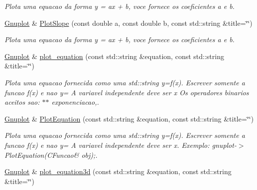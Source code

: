 \begin{DoxyCompactItemize}
\begin{DoxyCompactList}\small\item\em Plota uma equacao da forma y = ax + b, voce fornece os coeficientes a e b. \end{DoxyCompactList}\item 
\hypertarget{classGnuplot_af4c2215781aa7a32ba73caa26941407c}{\hyperlink{classGnuplot}{Gnuplot} \& \hyperlink{classGnuplot_af4c2215781aa7a32ba73caa26941407c}{Plot\-Slope} (const double a, const double b, const std\-::string \&title=\char`\"{}\char`\"{})}\label{classGnuplot_af4c2215781aa7a32ba73caa26941407c}

\begin{DoxyCompactList}\small\item\em Plota uma equacao da forma y = ax + b, voce fornece os coeficientes a e b. \end{DoxyCompactList}\item 
\hyperlink{classGnuplot}{Gnuplot} \& \hyperlink{classGnuplot_a42dfb8c9d4636745c7be277ed818e849}{plot\-\_\-equation} (const std\-::string \&equation, const std\-::string \&title=\char`\"{}\char`\"{})
\begin{DoxyCompactList}\small\item\em Plota uma equacao fornecida como uma std\-::string y=f(x). Escrever somente a funcao f(x) e nao y= A variavel independente deve ser x Os operadores binarios aceitos sao\-: $\ast$$\ast$ exponenciacao,. \end{DoxyCompactList}\item 
\hypertarget{classGnuplot_a901b030726d78e791f7005acf987bc44}{\hyperlink{classGnuplot}{Gnuplot} \& \hyperlink{classGnuplot_a901b030726d78e791f7005acf987bc44}{Plot\-Equation} (const std\-::string \&equation, const std\-::string \&title=\char`\"{}\char`\"{})}\label{classGnuplot_a901b030726d78e791f7005acf987bc44}

\begin{DoxyCompactList}\small\item\em Plota uma equacao fornecida como uma std\-::string y=f(x). Escrever somente a funcao f(x) e nao y= A variavel independente deve ser x. Exemplo\-: gnuplot-\/$>$Plot\-Equation(\-C\-Funcao\& obj);. \end{DoxyCompactList}\item 
\hypertarget{classGnuplot_a79aed3a6927f7d1d3497cba441e8a943}{\hyperlink{classGnuplot}{Gnuplot} \& \hyperlink{classGnuplot_a79aed3a6927f7d1d3497cba441e8a943}{plot\-\_\-equation3d} (const std\-::string \&equation, const std\-::string \&title=\char`\"{}\char`\"{})}\label{classGnuplot_a79aed3a6927f7d1d3497cba441e8a943}


\end{DoxyCompactItemize}
